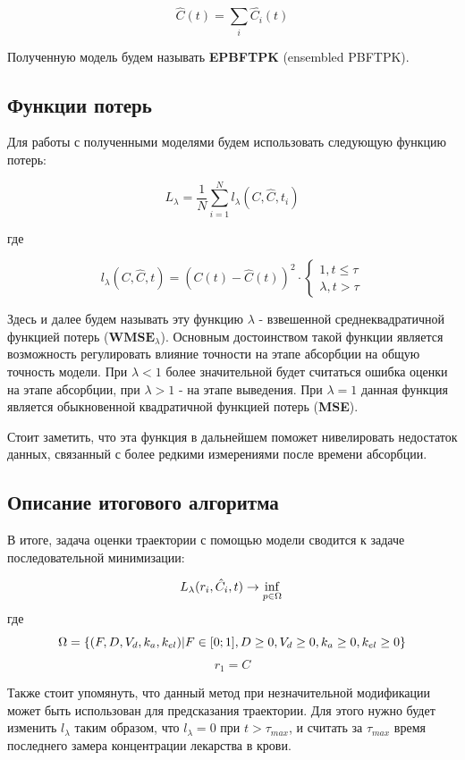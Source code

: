 \documentclass[12pt]{article}
\begin{document}
\[
	\hat{C}(t) = \sum_i \hat{C_i}(t)
\]

Полученную модель будем называть \textbf{EPBFTPK} (ensembled PBFTPK).

\subsection{Функции потерь}

Для работы с полученными моделями будем использовать следующую функцию потерь:

\[
	L_{\lambda} = \frac{1}{N} \sum_{i=1}^{N} l_{\lambda}(C, \hat{C}, t_i)
\]

где

\[
	l_{\lambda}(C, \hat{C}, t) = (C(t) - \hat{C}(t)) ^ 2 \cdot \begin{cases}
		1, t \leq \tau \\
		\lambda, t > \tau
	\end{cases}
\]

Здесь и далее будем называть эту функцию $\lambda$ - взвешенной среднеквадратичной функцией потерь ($\textbf{WMSE}_{\lambda}$). Основным достоинством такой функции является возможность регулировать влияние точности на этапе абсорбции на общую точность модели. При $\lambda < 1$ более значительной будет считаться ошибка оценки на этапе абсорбции, при $\lambda > 1$ - на этапе выведения. При $\lambda = 1$ данная функция является обыкновенной квадратичной функцией потерь (\textbf{MSE}).

Стоит заметить, что эта функция в дальнейшем поможет нивелировать недостаток данных, связанный с более редкими измерениями после времени абсорбции.

\subsection{Описание итогового алгоритма}

В итоге, задача оценки траектории с помощью модели сводится к задаче последовательной минимизации:


\[
	L_{\lambda}(r_i, \hat{C}_i, t) \rightarrow \inf_{p \in \Omega}                                          \\
\]
где
\[
	\Omega = \{ (F, D, V_d, k_a, k_{el}) | F \in [0; 1], D \geq 0, V_d \geq 0, k_a \geq 0, k_{el} \geq 0 \} \\
\]
\[
	r_1 = C
\]

Также стоит упомянуть, что данный метод при незначительной модификации может быть использован для предсказания траектории. Для этого нужно будет изменить $l_{\lambda}$ таким образом, что $l_{\lambda} = 0$ при $t > \tau_{max}$, и считать за $\tau_{max}$ время последнего замера концентрации лекарства в крови.
\end{document}
